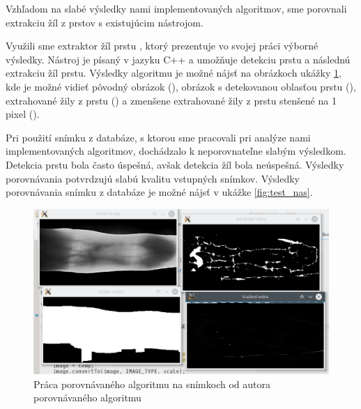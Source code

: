\documentclass[11pt,a4paper]{article}
\begin{document}
Vzhľadom na slabé výsledky nami implementovaných algoritmov, sme porovnali
extrakciu žíl z prstov s existujúcim nástrojom.

Využili sme extraktor žíl prstu \cite{konalio}, ktorý prezentuje vo svojej práci
výborné výsledky. Nástroj je písaný v jazyku C++ a umožňuje detekciu prstu
a následnú extrakciu žíl prstu. Výsledky algoritmu je možné nájsť na obrázkoch
ukážky \ref{fig:test_orig}, kde je možné vidieť pôvodný obrázok
(), obrázok s detekovanou oblasťou prstu
(), extrahované žily z prstu () a zmenšene extrahované žily z prstu stenšené na 1 pixel
().

Pri použití snímku z databáze, s ktorou sme pracovali pri analýze nami
implementovaných algoritmov, dochádzalo k neporovnateľne slabým výsledkom.
Detekcia prstu bola často úspešná, avšak detekcia žíl bola neúspešná.
Výsledky porovnávania potvrdzujú slabú kvalitu vstupných snímkov. Výsledky
porovnávania snímku z databáze je možné nájsť v ukážke \ref{fig:test_nas}.

\begin{landscape}
\begin{figure}[ht!]
	\centering
	\includegraphics[width=27cm]{fig/test_orig.eps}
	\caption{\label{fig:test_orig} Práca porovnávaného algoritmu na snímkoch od autora porovnávaného algoritmu}
\end{figure}
\end{landscape}
\end{document}

